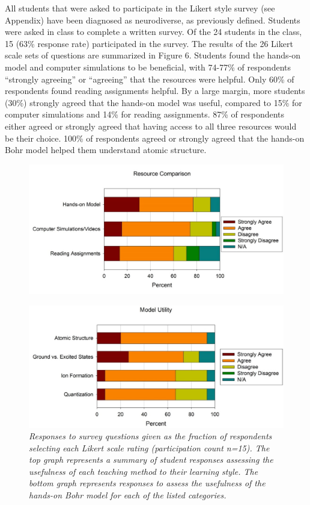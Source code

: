 \documentclass[11pt]{sig-alternate}
\begin{document}
\begin{large}
All students that were asked to participate in the Likert style survey (see Appendix) have been diagnosed as neurodiverse, as previously defined. Students were asked in class to complete a written survey. Of the 24 students in the class, 15 (63\% response rate) participated in the survey. The results of the 26 Likert scale sets of questions are summarized in Figure 6. Students found the hands-on model and computer simulations to be beneficial, with 74-77\% of respondents “strongly agreeing” or “agreeing” that the resources were helpful. Only 60\% of respondents found reading assignments helpful. By a large margin, more students (30\%) strongly agreed that the hands-on model was useful, compared to 15\% for computer simulations and 14\% for reading assignments. 87\% of respondents either agreed or strongly agreed that having access to all three resources would be their choice. 100\% of respondents agreed or strongly agreed that the hands-on Bohr model helped them understand atomic structure.

\begin{figure}[t]
    \centering
    \includegraphics[width=\textwidth]{figure 6_1 crop.png}
\end{figure}
\begin{figure}[h!]
    \centering
    \includegraphics[width=\textwidth]{figure 6_2.png}
    \captionsetup{font=large, labelfont=it}
    \caption{\textit{Responses to survey questions given as the fraction of respondents selecting each Likert scale rating (participation count n=15). The top graph represents a summary of student responses assessing the usefulness of each teaching method to their learning style. The bottom graph represents responses to assess the usefulness of the hands-on Bohr model for each of the listed categories.}}
    \label{Figure 6}
\end{figure}


\end{large}
\end{document}
